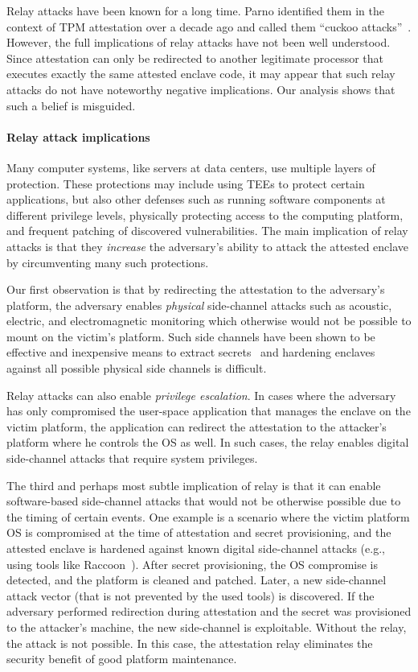\documentclass[letterpaper,twocolumn,10pt]{article}
\begin{document}
Relay attacks have been known for a long time. Parno identified them in the context of TPM attestation over a decade ago and called them ``cuckoo attacks''~\cite{parno2008bootstrapping}. However, the full implications of relay attacks have not been well understood. Since attestation can only be redirected to another legitimate processor that executes exactly the same attested enclave code, it may appear that such relay attacks do not have noteworthy negative implications. Our analysis shows that such a belief is misguided.


\paragraph{Relay attack implications}

Many computer systems, like servers at data centers, use multiple layers of protection. These protections may include using TEEs to protect certain applications, but also other defenses such as running software components at different privilege levels, physically protecting access to the computing platform, and frequent patching of discovered vulnerabilities. The main implication of relay attacks is that they \emph{increase} the adversary's ability to attack the attested enclave by circumventing many such protections.

Our first observation is that by redirecting the attestation to the adversary's platform, the adversary enables \emph{physical} side-channel attacks such as acoustic, electric, and electromagnetic monitoring which otherwise would not be possible to mount on the victim's platform. Such side channels have been shown to be effective and inexpensive means to extract secrets~\cite{genkin2016physical} and hardening enclaves against all possible physical side channels is difficult. 

Relay attacks can also enable \emph{privilege escalation}. In cases where the adversary has only compromised the user-space application that manages the enclave on the victim platform, the application can redirect the attestation to the attacker's platform where he controls the OS as well. In such cases, the relay enables digital side-channel attacks that require system privileges.

The third and perhaps most subtle implication of relay is that it can enable software-based side-channel attacks that would not be otherwise possible due to the timing of certain events. One example is a scenario where the victim platform OS is compromised at the time of attestation and secret provisioning, and the attested enclave is hardened against known digital side-channel attacks (e.g., using tools like Raccoon~\cite{raccoon}). After secret provisioning, the OS compromise is detected, and the platform is cleaned and patched. Later, a new side-channel attack vector (that is not prevented by the used tools) is discovered. If the adversary performed redirection during attestation and the secret was provisioned to the attacker's machine, the new side-channel is exploitable. Without the relay, the attack is not possible. In this case, the attestation relay eliminates the security benefit of good platform maintenance.
\end{document}
